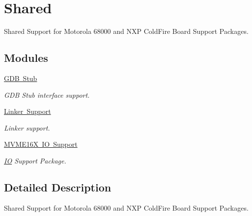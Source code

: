 \hypertarget{group__RTEMSBSPsM68kShared}{}\section{Shared}
\label{group__RTEMSBSPsM68kShared}


Shared Support for Motorola 68000 and N\+XP Cold\+Fire Board Support Packages.  


\subsection*{Modules}
\begin{DoxyCompactItemize}
\item 
\mbox{\hyperlink{group__m68k__gdbstub}{G\+D\+B Stub}}
\begin{DoxyCompactList}\small\item\em G\+DB Stub interface support. \end{DoxyCompactList}\item 
\mbox{\hyperlink{group__RTEMSBSPsM68kSharedLinker}{Linker Support}}
\begin{DoxyCompactList}\small\item\em Linker support. \end{DoxyCompactList}\item 
\mbox{\hyperlink{group__m68k__mvme}{M\+V\+M\+E16\+X I\+O Support}}
\begin{DoxyCompactList}\small\item\em \mbox{\hyperlink{structIO}{IO}} Support Package. \end{DoxyCompactList}\end{DoxyCompactItemize}


\subsection{Detailed Description}
Shared Support for Motorola 68000 and N\+XP Cold\+Fire Board Support Packages. 

